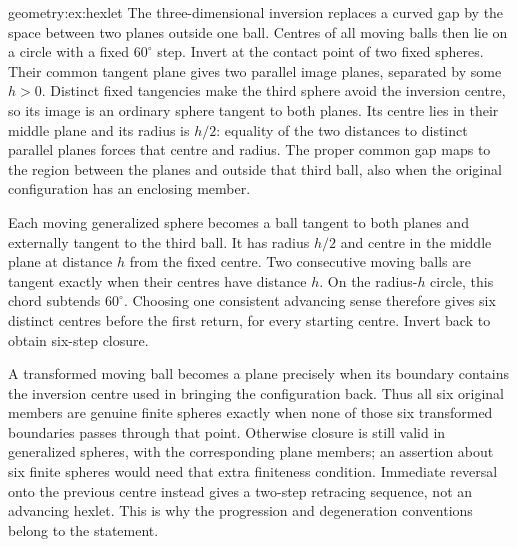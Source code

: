 \begin{solution}{geometry:ex:hexlet}
\idea The three-dimensional inversion replaces a curved gap by the space between two planes outside one ball. Centres of all moving balls then lie on a circle with a fixed $60^\circ$ step.
\writeup Invert at the contact point of two fixed spheres. Their common tangent plane gives two parallel image planes, separated by some $h>0$. Distinct fixed tangencies make the third sphere avoid the inversion centre, so its image is an ordinary sphere tangent to both planes. Its centre lies in their middle plane and its radius is $h/2$: equality of the two distances to distinct parallel planes forces that centre and radius. The proper common gap maps to the region between the planes and outside that third ball, also when the original configuration has an enclosing member.

Each moving generalized sphere becomes a ball tangent to both planes and externally tangent to the third ball. It has radius $h/2$ and centre in the middle plane at distance $h$ from the fixed centre. Two consecutive moving balls are tangent exactly when their centres have distance $h$. On the radius-$h$ circle, this chord subtends $60^\circ$. Choosing one consistent advancing sense therefore gives six distinct centres before the first return, for every starting centre. Invert back to obtain six-step closure.

A transformed moving ball becomes a plane precisely when its boundary contains the inversion centre used in bringing the configuration back. Thus all six original members are genuine finite spheres exactly when none of those six transformed boundaries passes through that point. Otherwise closure is still valid in generalized spheres, with the corresponding plane members; an assertion about six finite spheres would need that extra finiteness condition. Immediate reversal onto the previous centre instead gives a two-step retracing sequence, not an advancing hexlet. This is why the progression and degeneration conventions belong to the statement.
\end{solution}

